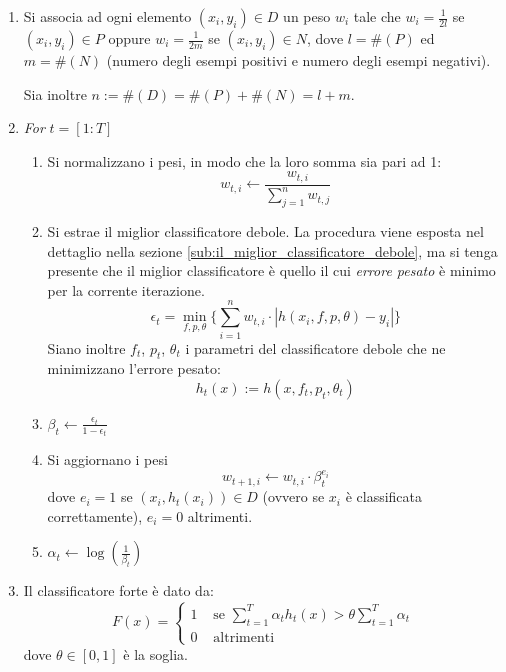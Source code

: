 \begin{enumerate}
    \item Si associa ad ogni elemento $(x_i, y_i) \in D$ un peso $w_i$ tale che $w_i = \frac{1}{2l}$ se $(x_i, y_i) \in P$ oppure $w_i = \frac{1}{2m}$ se $(x_i, y_i) \in N$, dove $l = \#(P)$ ed $m = \#(N)$ (numero degli esempi positivi e numero degli esempi negativi).

    Sia inoltre $n := \#(D) = \#(P) + \#(N) = l + m$.

    \item \emph{For} $t = [1:T]$
    \begin{enumerate}
        \item Si normalizzano i pesi, in modo che la loro somma sia pari ad 1:
        $$ w_{t,i} \leftarrow \frac{w_{t,i}}{\sum_{j = 1}^{n}w_{t,j}}$$

        \item \label{adaboost_minimum_error}
        Si estrae il miglior classificatore debole. La procedura viene esposta nel dettaglio nella sezione \ref{sub:il_miglior_classificatore_debole}, ma si tenga presente che il miglior classificatore è quello il cui \emph{errore pesato} è minimo per la corrente iterazione.
        $$ \epsilon_t = \min_{f,p,\theta} \{
        \sum_{i = 1}^{n} w_{t,i} \cdot |h(x_i, f, p, \theta) - y_i|
        \} $$
        Siano inoltre $f_t$, $p_t$, $\theta_t$ i parametri del classificatore debole che ne minimizzano l'errore pesato:
        $$ h_t(x) := h(x, f_t, p_t, \theta_t) $$

        \item \label{adaboost_beta} $\beta_t \leftarrow \frac{\epsilon_t}{1 - \epsilon_t}$

        \item \label{adaboost_update_weights} Si aggiornano i pesi
        $$ w_{t+1, i} \leftarrow w_{t,i} \cdot \beta_{t}^{e_i} $$
        dove $e_i = 1$ se $(x_i, h_t(x_i)) \in D$ (ovvero se $x_i$ è classificata correttamente), $e_i = 0$ altrimenti.

        \item $\alpha_t \leftarrow \log(\frac{1}{\beta_t})$
    \end{enumerate}

    \item \label{adaboost_strong_classifier} Il classificatore forte è dato da:
    \begin{equation}
        F(x) = \begin{cases}
        1 & \text{ se } \sum_{t = 1}^{T} \alpha_t h_t(x) > \theta \sum_{t = 1}^{T} \alpha_t \\
        0 & \text{ altrimenti }
    \end{cases}
\end{equation}
dove $\theta \in [0,1]$ è la soglia.
\end{enumerate}

